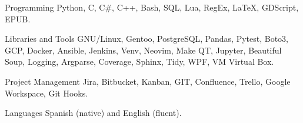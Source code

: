 

\begin{cvskills}

  \cvskill
    {Programming} %
    {Python, C, C\#, C++, Bash, SQL, Lua, RegEx, LaTeX, GDScript, EPUB.} %

  \cvskill
    {Libraries and Tools}
    {GNU/Linux, Gentoo, PostgreSQL, Pandas, Pytest, Boto3, GCP, Docker, Ansible, Jenkins, Venv, Neovim, Make}
  \cvskill
    {}
    {QT, Jupyter, Beautiful Soup, Logging, Argparse, Coverage, Sphinx, Tidy, WPF, VM Virtual Box.}

  \cvskill
    {Project Management}
    {Jira, Bitbucket, Kanban, GIT, Confluence, Trello, Google Workspace, Git Hooks.}

  \cvskill
    {Languages}
    {Spanish (native) and English (fluent).}


\end{cvskills}
